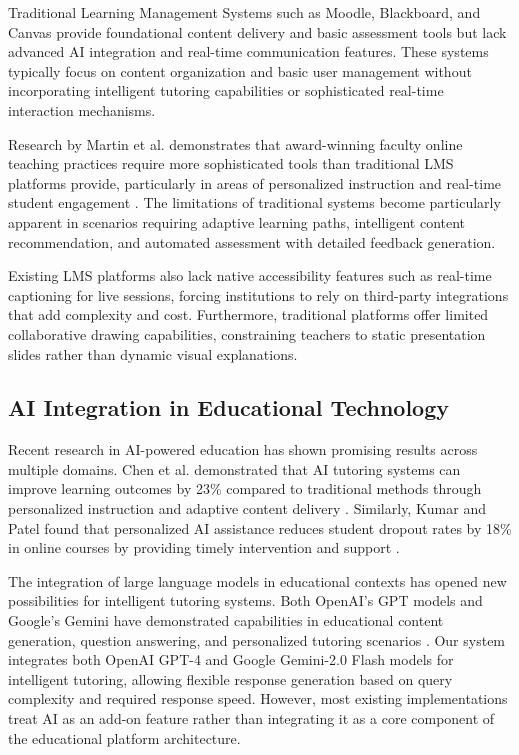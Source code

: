 \documentclass[onecolumn]{IEEEtran}
\begin{document}
Traditional Learning Management Systems such as Moodle, Blackboard, and Canvas provide foundational content delivery and basic assessment tools but lack advanced AI integration and real-time communication features. These systems typically focus on content organization and basic user management without incorporating intelligent tutoring capabilities or sophisticated real-time interaction mechanisms.

Research by Martin et al. demonstrates that award-winning faculty online teaching practices require more sophisticated tools than traditional LMS platforms provide, particularly in areas of personalized instruction and real-time student engagement \cite{martin2020}. The limitations of traditional systems become particularly apparent in scenarios requiring adaptive learning paths, intelligent content recommendation, and automated assessment with detailed feedback generation.

Existing LMS platforms also lack native accessibility features such as real-time captioning for live sessions, forcing institutions to rely on third-party integrations that add complexity and cost. Furthermore, traditional platforms offer limited collaborative drawing capabilities, constraining teachers to static presentation slides rather than dynamic visual explanations.

\subsection{AI Integration in Educational Technology}

Recent research in AI-powered education has shown promising results across multiple domains. Chen et al. demonstrated that AI tutoring systems can improve learning outcomes by 23\% compared to traditional methods through personalized instruction and adaptive content delivery \cite{chen2022}. Similarly, Kumar and Patel found that personalized AI assistance reduces student dropout rates by 18\% in online courses by providing timely intervention and support \cite{kumar2023}.

The integration of large language models in educational contexts has opened new possibilities for intelligent tutoring systems. Both OpenAI's GPT models and Google's Gemini have demonstrated capabilities in educational content generation, question answering, and personalized tutoring scenarios \cite{openai2023}. Our system integrates both OpenAI GPT-4 and Google Gemini-2.0 Flash models for intelligent tutoring, allowing flexible response generation based on query complexity and required response speed. However, most existing implementations treat AI as an add-on feature rather than integrating it as a core component of the educational platform architecture.
\end{document}
